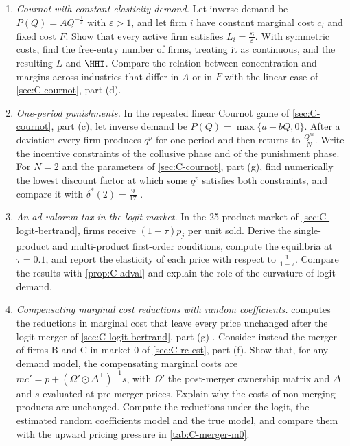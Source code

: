 \begin{enumerate}
\item \emph{Cournot with constant-elasticity demand.} Let inverse demand be $P(Q) = AQ^{-\frac{1}{\varepsilon}}$ with
  $\varepsilon > 1$, and let firm $i$ have constant marginal cost $c_i$ and fixed cost $F$. Show that every active firm
  satisfies $L_i = \frac{s_i}{\varepsilon}$. With symmetric costs, find the free-entry number of firms, treating it as
  continuous, and the resulting $L$ and $\HHI$. Compare the relation between concentration and margins across
  industries that differ in $A$ or in $F$ with the linear case of \cref{sec:C-cournot}, part (d).

\item \emph{One-period punishments.} In the repeated linear Cournot game of \cref{sec:C-cournot}, part (c), let inverse
  demand be $P(Q) = \max\{a - bQ, 0\}$. After a deviation every firm produces $q^p$ for one period and then returns to
  $\frac{Q^m}{N}$. Write the incentive constraints of the collusive phase and of the punishment phase. For $N = 2$ and
  the parameters of \cref{sec:C-cournot}, part (g), find numerically the lowest discount factor at which some $q^p$
  satisfies both constraints, and compare it with $\delta^*(2) = \frac{9}{17}$ \citep{Abreu1986}.

\item \emph{An ad valorem tax in the logit market.} In the 25-product market of \cref{sec:C-logit-bertrand}, firms
  receive $(1 - \tau)p_j$ per unit sold. Derive the single-product and multi-product first-order conditions, compute the
  equilibria at $\tau = 0.1$, and report the elasticity of each price with respect to $\frac{1}{1 - \tau}$. Compare the
  results with \cref{prop:C-adval} and explain the role of the curvature of logit demand.

\item \emph{Compensating marginal cost reductions with random coefficients.}  computes the
  reductions in marginal cost that leave every price unchanged after the logit merger of \cref{sec:C-logit-bertrand},
  part (g) \citep{Werden1996}. Consider instead the merger of firms B and C in market 0 of \cref{sec:C-rc-est},
  part (f). Show that, for any demand model, the compensating marginal costs are
  $mc' = p + (\Omega' \odot \Delta^\top)^{-1}s$, with $\Omega'$ the post-merger ownership matrix and $\Delta$ and $s$
  evaluated at pre-merger prices. Explain why the costs of non-merging products are unchanged. Compute the reductions
  under the logit, the estimated random coefficients model and the true model, and compare them with the upward
  pricing pressure in \cref{tab:C-merger-m0}.


\end{enumerate}
